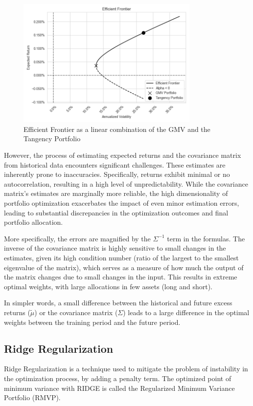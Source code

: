 \documentclass{article}
\begin{document}
\begin{figure}[h]
    \centering
    \includegraphics[width=0.8\textwidth]{graphics/illustrations/efficient_frontier.png}
    \caption{Efficient Frontier as a linear combination of the GMV and the Tangency Portfolio}
    \label{fig:efficient_frontier}
\end{figure}

However, the process of estimating expected returns and the covariance matrix from historical data encounters significant challenges. These estimates are inherently prone to inaccuracies. Specifically, returns exhibit minimal or no autocorrelation, resulting in a high level of unpredictability. While the covariance matrix's estimates are marginally more reliable, the high dimensionality of portfolio optimization exacerbates the impact of even minor estimation errors, leading to substantial discrepancies in the optimization outcomes and final portfolio allocation.

More specifically, the errors are magnified by the $\Sigma^{-1}$ term in the formulas. The inverse of the covariance matrix is highly sensitive to small changes in the estimates, given its high condition number (ratio of the largest to the smallest eigenvalue of the matrix), which serves as a measure of how much the output of the matrix changes due to small changes in the input. This results in extreme optimal weights, with large allocations in few assets (long and short).

In simpler words, a small difference between the historical and future excess returns ($\tilde{\mu}$) or the covariance matrix ($\Sigma$) leads to a large difference in the optimal weights between the training period and the future period.

\subsection{Ridge Regularization}
Ridge Regularization is a technique used to mitigate the problem of instability in the optimization process, by adding a penalty term. The optimized point of minimum variance with RIDGE is called the Regularized Minimum Variance Portfolio (RMVP).
\end{document}

